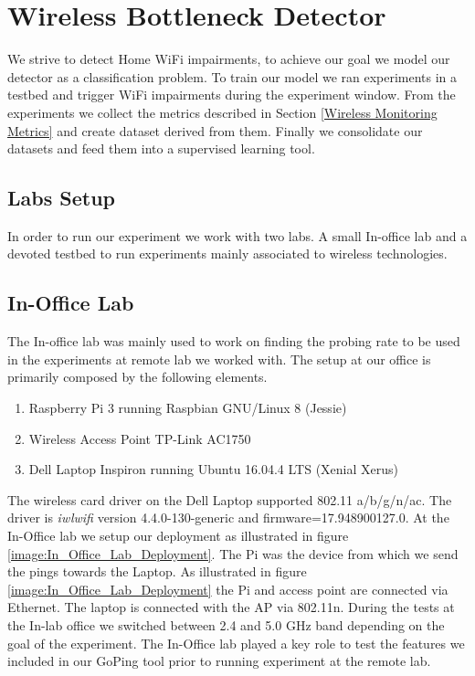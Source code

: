 \section{Wireless Bottleneck Detector}\label{Wireless Bottleneck Detector}

We strive to detect Home WiFi impairments, to achieve our goal we model our detector as a classification problem. To train our model we ran experiments in a testbed and trigger WiFi impairments during the experiment window. From the experiments we collect the metrics described in Section \ref{Wireless Monitoring Metrics} and create dataset derived from them. Finally we consolidate our datasets and feed them into a supervised learning tool. 

\subsection{Labs Setup}

In order to run our experiment we work with two labs. A small In-office lab and a devoted testbed to run experiments mainly associated to wireless technologies.

\subsection*{In-Office Lab}

The In-office lab was mainly used to work on finding the probing rate to be used in the experiments at remote lab we worked with. The setup at our office is primarily composed by the following elements.

\begin{enumerate}
	\item Raspberry Pi 3 running Raspbian GNU/Linux 8 (Jessie)
	\item Wireless Access Point TP-Link AC1750
	\item Dell Laptop Inspiron running Ubuntu 16.04.4 LTS (Xenial Xerus)
\end{enumerate}
	
	The wireless card driver on the Dell Laptop supported 802.11 a/b/g/n/ac. The driver is \textit{iwlwifi} version 4.4.0-130-generic and firmware=17.948900127.0. At the In-Office lab we setup our deployment as illustrated in figure \ref{image:In_Office_Lab_Deployment}. The Pi was the device from which we send the pings towards the Laptop. As illustrated in figure \ref{image:In_Office_Lab_Deployment} the Pi and access point are connected via Ethernet. The laptop is connected with the AP via 802.11n. During the tests at the In-lab office we switched between 2.4 and 5.0 GHz band depending on the goal of the experiment. The In-Office lab played a key role to test the features we included in our GoPing tool prior to running experiment at the remote lab.
	
